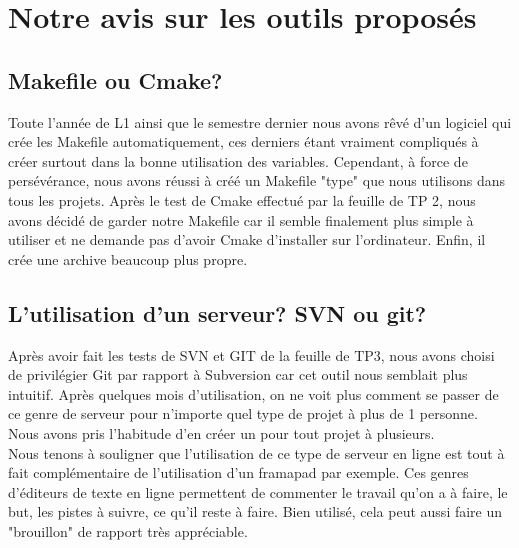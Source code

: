 \documentclass{report}
\begin{document}
\chapter{Notre avis sur les outils proposés}

\section{Makefile ou Cmake?}
Toute l'année de L1 ainsi que le semestre dernier nous avons rêvé d'un logiciel qui crée les Makefile automatiquement, ces derniers étant vraiment compliqués à créer surtout dans la bonne utilisation des variables. Cependant, à force de persévérance, nous avons réussi à créé un Makefile "type" que nous utilisons dans tous les projets. Après le test de Cmake effectué par la feuille de TP 2, nous avons décidé de garder notre Makefile car il semble finalement plus simple à utiliser et ne demande pas d'avoir Cmake d'installer sur l'ordinateur. Enfin, il crée une archive beaucoup plus propre.

\section{L'utilisation d'un serveur? SVN ou git?}
Après avoir fait les tests de SVN et GIT de la feuille de TP3, nous avons choisi de privilégier Git par rapport à Subversion car cet outil nous  semblait plus intuitif. Après quelques mois d'utilisation, on ne voit plus comment se passer de ce genre de serveur pour n'importe quel type de projet à plus de 1 personne. Nous avons pris l'habitude d'en créer un pour tout projet à plusieurs.\\
Nous tenons à souligner que l'utilisation de ce type de serveur en ligne est tout à fait complémentaire de l'utilisation d'un framapad par exemple. Ces genres d'éditeurs de texte en ligne permettent de commenter le travail qu'on a à faire, le but, les pistes à suivre, ce qu'il reste à faire. Bien utilisé, cela peut aussi faire un "brouillon" de rapport très appréciable.
\end{document}
